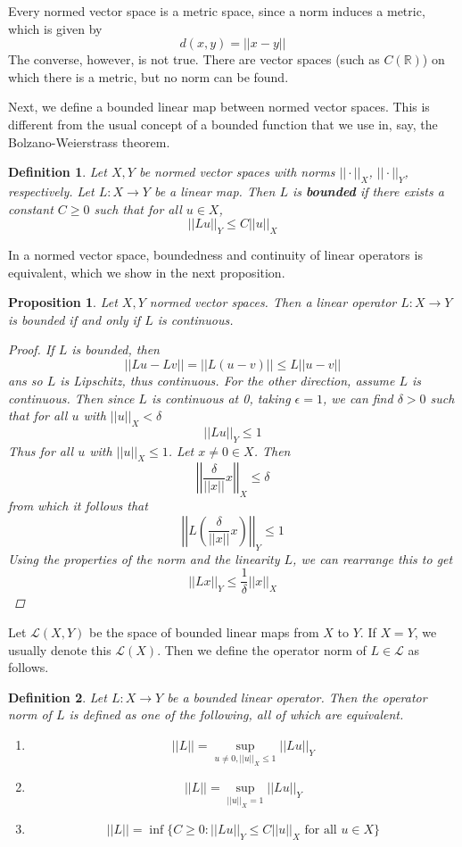 \documentclass[12pt]{amsart}         %
\newtheorem{definition}{Definition}[section]
\newtheorem{proposition}{Proposition}[section]
\theoremstyle{remark}
\newcommand{\R}{\mathbb{R}}
\begin{document}
Every normed vector space is a metric space, since a norm induces a metric, which is given by
\[
d(x,y) = ||x-y||
\]
The converse, however, is not true. There are vector spaces (such as $C(\R)$) on which there is a metric, but no norm can be found.

Next, we define a bounded linear map between normed vector spaces. This is different from the usual concept of a bounded function that we use in, say, the Bolzano-Weierstrass theorem.

\begin{definition}
Let $X, Y$ be normed vector spaces with norms $||\cdot||_X$, $||\cdot||_Y$, respectively. Let $L: X \rightarrow Y$ be a linear map. Then $L$ is \textbf{bounded} if there exists a constant $C \geq 0$ such that for all $u \in X$,
\[
||Lu||_Y \leq C ||u||_X
\]
\end{definition}

In a normed vector space, boundedness and continuity of linear operators is equivalent, which we show in the next proposition.

\begin{proposition}
Let $X, Y$ normed vector spaces. Then a linear operator $L: X \rightarrow Y$ is bounded if and only if $L$ is continuous.
\begin{proof}
If $L$ is bounded, then 
\[
||Lu - Lv|| = ||L(u - v)|| \leq L ||u - v||
\]
ans so $L$ is Lipschitz, thus continuous. For the other direction, assume $L$ is continuous. Then since $L$ is continuous at 0, taking $\epsilon = 1$, we can find $\delta > 0$ such that for all $u$ with $||u||_X < \delta$
\[
||Lu||_Y \leq 1
\]
Thus for all $u$ with $||u||_X \leq 1$. Let $x \neq 0 \in X$. Then 
\[
\left|\left| \frac{\delta}{||x||}x \right|\right|_X \leq \delta
\]
from which it follows that 
\[
\left|\left| L\left( \frac{\delta}{||x||}x \right) \right|\right|_Y \leq 1
\]
Using the properties of the norm and the linearity $L$, we can rearrange this to get
\[
||L x||_Y \leq \frac{1}{\delta} ||x||_X
\]
\end{proof}
\end{proposition}

Let $\mathcal{L}(X, Y)$ be the space of bounded linear maps from $X$ to $Y$. If $X = Y$, we usually denote this $\mathcal{L}(X)$. Then we define the operator norm of $L \in \mathcal{L}$ as follows.

\begin{definition}
Let $L: X \rightarrow Y$ be a bounded linear operator. Then the \emph{operator norm} of $L$ is defined as one of the following, all of which are equivalent.
\begin{enumerate}
\item 
\[
||L|| = \sup_{u \neq 0, ||u||_X \leq 1} ||Lu||_Y 
\]
\item 
\[
||L|| = \sup_{||u||_X = 1} ||Lu||_Y 
\]
\item
\[
||L|| = \inf\{ C \geq 0: ||Lu||_Y \leq C ||u||_X \text{ for all } u \in X \}
\]
\end{enumerate}
\end{definition}
\end{document}
